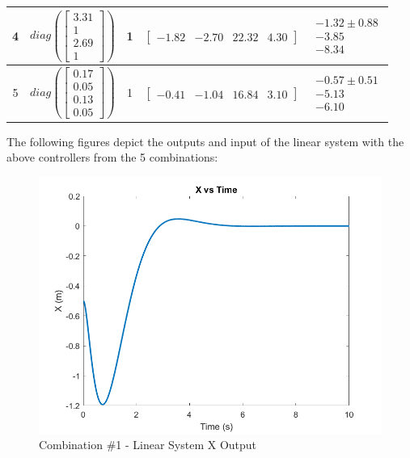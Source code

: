 \begin{table}[!ht]
\begin{tabular}{|*5{c|}}
        \hline
        4    & $diag\left(\begin{bmatrix}3.31 \\ 1  \\ 2.69 \\ 1 \end{bmatrix}\right)$       & 1   & $\begin{bmatrix} -1.82 & -2.70 & 22.32 & 4.30  \end{bmatrix}$ & $\begin{array}{cc} -1.32\pm0.88 \\  -3.85 \\ -8.34\end{array}$  \\
        \hline
        5    & $diag\left(\begin{bmatrix}0.17 \\ 0.05  \\ 0.13 \\ 0.05 \end{bmatrix}\right)$ & 1   & $\begin{bmatrix} -0.41 & -1.04 & 16.84 & 3.10  \end{bmatrix}$ & $\begin{array}{cc} -0.57\pm0.51 \\  -5.13 \\ -6.10\end{array}$  \\
        \hline
    \end{tabular}
\end{table}

\clearpage

The following figures depict the outputs and input of the linear system with the above controllers from the 5 combinations:

\begin{figure}[!ht]
    \centering
    \includegraphics[width=\linewidth]{figs/sf_lin_c1_x.png}
    \caption{Combination $\#$1 - Linear System X Output}
    \label{}
\end{figure}

